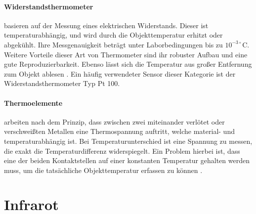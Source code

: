 \paragraph{Widerstandsthermometer}\label{par:widerstandsthermo}

 basieren auf der Messung eines elektrischen Widerstands. Dieser ist temperaturabhängig, und wird durch die Objekttemperatur erhitzt oder abgekühlt. Ihre Messgenauigkeit beträgt unter Laborbedingungen bis zu $10^{-3 \circ}\text{C}$.\\
Weitere Vorteile dieser Art von Thermometer sind ihr robuster Aufbau und eine gute Reproduzierbarkeit. Ebenso lässt sich die Temperatur aus großer Entfernung zum Objekt ablesen \cite{Siddiqi}. Ein häufig verwendeter Sensor dieser Kategorie ist der Widerstandsthermometer Typ Pt 100.

\paragraph{Thermoelemente}\label{par:thermoelemente}

 arbeiten nach dem Prinzip, dass zwischen zwei miteinander verlötet oder verschweißten Metallen eine Thermospannung auftritt, welche material- und temperaturabhängig ist. 
Bei Temperaturunterschied ist eine Spannung zu messen, die exakt die Temperaturdifferenz widerspiegelt. Ein Problem hierbei ist, dass eine der beiden Kontaktstellen auf einer konstanten Temperatur gehalten werden muss, um die tatsächliche Objekttemperatur erfassen zu können \cite{Siddiqi}.

\section{Infrarot}\label{sec:infrarot}

